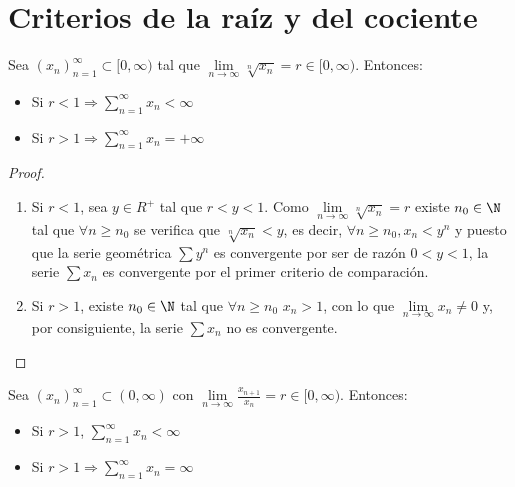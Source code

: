 \section{Criterios de la raíz y del cociente}
\begin{theorem}
	Sea \((x_n)^{\infty}_{n=1} \subset [0,\infty)\) tal que \(\lim\limits_{n \to \infty} \sqrt[n]{x_n} = r \in [0,\infty) \). Entonces:
	\begin{itemize}
		\item Si \(r < 1 \Rightarrow \sum_{n =1}^{\infty} x_n < \infty \)
		\item Si \(r > 1 \Rightarrow \sum_{n =1}^{\infty} x_n = +\infty\)
	\end{itemize}
\end{theorem}
\begin{proof}
	\begin{enumerate}
		\item Si \(r< 1\), sea \(y \in R^{+ }\) tal que \(r < y < 1 \). Como \(\lim\limits_{n \to \infty} \sqrt[n]{x_n} = r \) existe \(n_0 \in \N\) tal que \(\forall n \geq n_0\) se verifica que \(\sqrt[n]{x_n} <y\), es decir, \(\forall n \geq n_0, x_n < y^{n}\) y puesto que la serie geométrica \(\sum y^{n }\) es convergente por ser de razón \(0 < y < 1\), la serie \(\sum x_n 	\) es convergente por el primer criterio de comparación.
		\item Si \(r > 1 \), existe \(n_0 \in \N\) tal que \(\forall n \geq n_0\) \(x_n > 1\), con lo que \(\lim\limits_{n  \to \infty} x_n \neq 0\) y, por consiguiente, la serie \(\sum x_{n } \) no es convergente.
	\end{enumerate}
\end{proof}
\begin{theorem}
	Sea \((x_n)^{\infty}_{n=1} \subset (0, \infty)\) con \(\lim\limits_{n \to \infty} \frac{x_{n+1}}{x_n } = r \in [0,\infty)\). Entonces:
	\begin{itemize}
		\item Si \(r > 1 \), \(\sum_{n =1}^{\infty} x_n < \infty\)
		\item Si \(r > 1 \Rightarrow \sum_{n =1}^{\infty} x_n = \infty \)
	\end{itemize}
\end{theorem}
